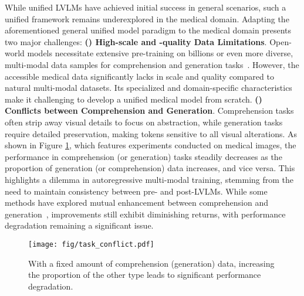 While unified LVLMs have achieved initial success in general scenarios, such a unified framework remains underexplored in the medical domain.
Adapting the aforementioned general unified model paradigm to the medical domain presents two major challenges:
\textbf{() High-scale and -quality Data Limitations}. Open-world models necessitate extensive pre-training on billions or even more diverse, multi-modal data samples for comprehension and generation tasks~\cite{lu2024unified,team2024chameleon}. However, the accessible medical data significantly lacks in scale and quality compared to natural multi-modal datasets. Its specialized and domain-specific characteristics make it challenging to develop a unified medical model from scratch.
\textbf{() Conflicts between Comprehension and Generation}. 
Comprehension tasks often strip away visual details to focus on abstraction, while generation tasks require detailed preservation, making tokens sensitive to all visual alterations.
As shown in Figure \ref{fig:conflict}, which features experiments conducted on medical images, the performance in comprehension (or generation) tasks steadily decreases as the proportion of generation (or comprehension) data increases, and vice versa. This highlights a dilemma in autoregressive multi-modal training, stemming from the need to maintain consistency between pre- and post-LVLMs. While some methods have explored mutual enhancement between comprehension and generation~\cite{pan2024auto,tong2024metamorph}, improvements still exhibit diminishing returns, with performance degradation remaining a significant issue.
\begin{figure}[t]
    \centering
    \texttt{[image: fig/task\_conflict.pdf]}
    \caption{With a fixed amount of comprehension (generation) data, increasing the proportion of the other type leads to significant performance degradation.}
    \label{fig:conflict}
\end{figure}

